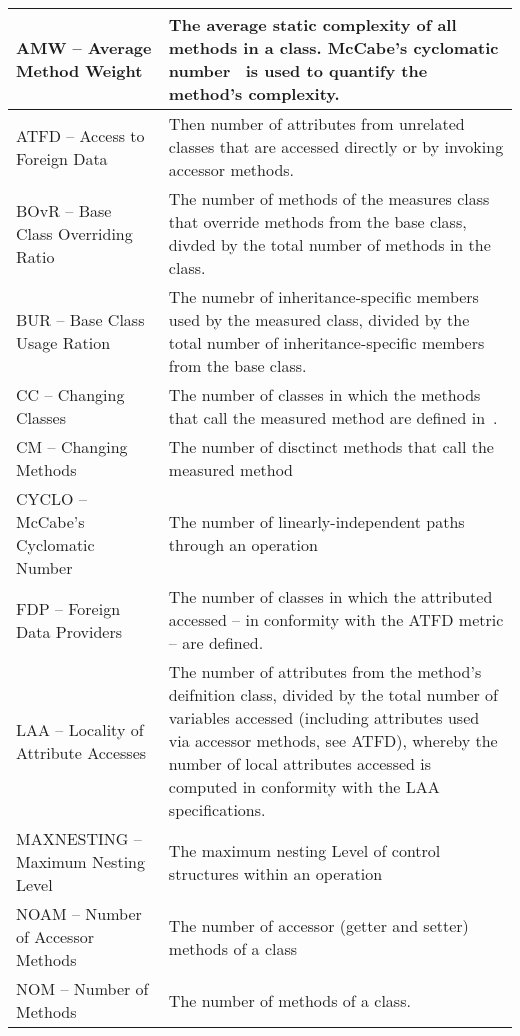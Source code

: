 \begin{table}[!h]
\centering
\begin{tabular}{L{4cm}|L{12cm}}
 AMW -- Average Method Weight & The average static complexity of all methods in a class.\cite{Marinescu02} McCabe's cyclomatic number~\cite{McCabe76} is used to quantify the method's complexity. \\
 \midrule
 ATFD -- Access to Foreign Data & Then number of attributes from unrelated classes that are accessed directly or by invoking accessor methods.\cite{Marinescu02} \\
 \midrule
 BOvR -- Base Class Overriding Ratio & The number of methods of the measures class that override methods from the base class, divded by the total number of methods in the class.\cite{Lanza2006} \\
 \midrule
 BUR -- Base Class Usage Ration & The numebr of inheritance-specific members used by the measured class, divided by the total number of inheritance-specific members from the base class.\cite{Lanza2006} \\
 \midrule
 CC -- Changing Classes & The number of classes in which the methods that call the measured method are defined in~\cite{Marinescu02}.\\
 \midrule
 CM -- Changing Methods & The number of disctinct methods that call the measured method \cite{Marinescu02} \\
 \midrule
 CYCLO -- McCabe's Cyclomatic Number & The number of linearly-independent paths through an operation\cite{McCabe76} \\
 \midrule
 FDP -- Foreign Data Providers & The number of classes in which the attributed accessed -- in conformity with the ATFD metric -- are defined.\cite{Lanza2006} \\
 \midrule
 LAA -- Locality of Attribute Accesses & The number of attributes from the method's deifnition class, divided by the total number of variables accessed (including attributes used via accessor methods, see ATFD), whereby the number of local attributes accessed is computed in conformity with the LAA specifications.\cite{Lanza2006} \\
 \midrule
 MAXNESTING -- Maximum Nesting Level & The maximum nesting Level of control structures within an operation\cite{Lanza2006}\\
 \midrule
 NOAM -- Number of Accessor Methods & The number of accessor (getter and setter) methods of a class\cite{Lanza2006}\\
 \midrule
 NOM -- Number of Methods & The number of methods of a class. \\

\end{tabular}
\end{table}
